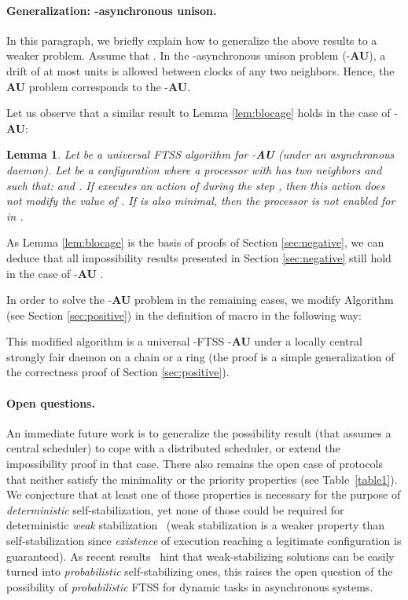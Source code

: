 \documentclass[11pt,english,letterpaper]{article}
\newtheorem{lemma}{Lemma}
\begin{document}
\paragraph{Generalization: -asynchronous unison.} In this paragraph, we briefly explain how to generalize the above results to a weaker problem. Assume that . In the -asynchronous unison problem (-\textbf{AU}), a drift of at most  units is allowed between clocks of any two neighbors. Hence, the \textbf{AU} problem corresponds to the -\textbf{AU}.

Let us observe that a similar result to Lemma \ref{lem:blocage} holds in the case of -\textbf{AU}:

\begin{lemma}
Let  be a universal FTSS algorithm for -\textbf{AU} (under an asynchronous daemon). Let  be a configuration where a processor  with  has two neighbors  and  such that:  and .
	If  executes an action of  during the step , then this action does not modify the value of .
  If  is also minimal, then the processor  is not enabled for  in .
\end{lemma}

As Lemma \ref{lem:blocage} is the basis of proofs of Section \ref{sec:negative}, we can deduce that all impossibility results presented in Section \ref{sec:negative} still hold in the case of -\textbf{AU} .

In order to solve the -\textbf{AU} problem in the remaining cases, we modify Algorithm  (see Section \ref{sec:positive}) in the definition of macro  in the following way:


This modified algorithm is a universal -FTSS -\textbf{AU} under a locally central strongly fair daemon on a chain or a ring (the proof is a simple generalization of the correctness proof of Section \ref{sec:positive}).

\paragraph{Open questions.} An immediate future work is to generalize the possibility result (that assumes a central scheduler) to cope with a distributed scheduler, or extend the impossibility proof in that case. There also remains the open case of protocols that neither satisfy the minimality or the priority properties (see Table~\ref{table1}). We conjecture that at least one of those properties is necessary for the purpose of \emph{deterministic} self-stabilization, yet none of those could be required for deterministic \emph{weak} stabilization~\cite{G01cb} (weak stabilization is a weaker property than self-stabilization since \emph{existence} of execution reaching a legitimate configuration is guaranteed). As recent results~\cite{DTY08c} hint that weak-stabilizing solutions can be easily turned into \emph{probabilistic} self-stabilizing ones, this raises the open question of the possibility of \emph{probabilistic} FTSS for dynamic tasks in asynchronous systems.
\end{document}
